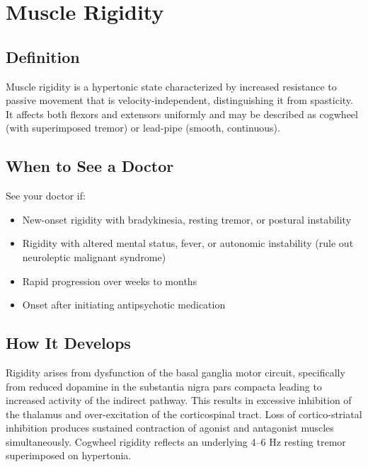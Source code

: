 \chapter{Muscle Rigidity}

\section*{Definition}
Muscle rigidity is a hypertonic state characterized by increased resistance to passive movement that is velocity-independent, distinguishing it from spasticity. It affects both flexors and extensors uniformly and may be described as cogwheel (with superimposed tremor) or lead-pipe (smooth, continuous).

\section*{When to See a Doctor}
See your doctor if:
\begin{itemize}
  \item New-onset rigidity with bradykinesia, resting tremor, or postural instability
  \item Rigidity with altered mental status, fever, or autonomic instability (rule out neuroleptic malignant syndrome)
  \item Rapid progression over weeks to months
  \item Onset after initiating antipsychotic medication
\end{itemize}

\section*{How It Develops}
Rigidity arises from dysfunction of the basal ganglia motor circuit, specifically from reduced dopamine in the substantia nigra pars compacta leading to increased activity of the indirect pathway. This results in excessive inhibition of the thalamus and over-excitation of the corticospinal tract. Loss of cortico-striatal inhibition produces sustained contraction of agonist and antagonist muscles simultaneously. Cogwheel rigidity reflects an underlying 4--6 Hz resting tremor superimposed on hypertonia.

